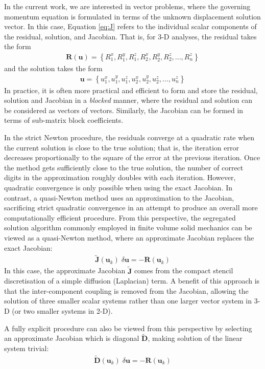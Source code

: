 \documentclass[sn-mathphys,Numbered]{sn-jnl}%
\newcommand{\bb}{\boldsymbol}
\begin{document}
In the current work, we are interested in vector problems, where the governing momentum equation is formulated in terms of the unknown displacement solution vector.
In this case, Equation \ref{eq:J} refers to the individual scalar components of the residual, solution, and Jacobian.
That is, for 3-D analyses, the residual takes the form
\begin{eqnarray}
	\bb{R}(\bb{u}) = \left\{ R_1^x, R_1^y, R_1^z, R_2^x, R_2^y, R_2^z, ..., R_n^z \right\}
\end{eqnarray}
and the solution takes the form
\begin{eqnarray}
	\bb{u} = \left\{ u_1^x, u_1^y, u_1^z, u_2^x, u_2^y, u_2^z, ..., u_n^z \right\}
\end{eqnarray}
In practice, it is often more practical and efficient to form and store the residual, solution and Jacobian in a \emph{blocked} manner, where the residual and solution can be considered as vectors of vectors.
Similarly, the Jacobian can be formed in terms of sub-matrix block coefficients.

In the strict Newton procedure, the residuals converge at a quadratic rate when the current solution is close to the true solution; that is, the iteration error decreases proportionally to the square of the error at the previous iteration.
Once the method gets sufficiently close to the true solution, the number of correct digits in the approximation roughly doubles with each iteration. 
However, quadratic convergence is only possible when using the exact Jacobian.
In contrast, a quasi-Newton method uses an approximation to the Jacobian, sacrificing strict quadratic convergence in an attempt to produce an overall more computationally efficient procedure.
From this perspective, the segregated solution algorithm commonly employed in finite volume solid mechanics can be viewed as a quasi-Newton method, where an approximate Jacobian replaces the exact Jacobian: 
\begin{eqnarray} \label{eq:Seg}
    \bb{\tilde{J}}(\bb{u}_k) \;\delta \bb{u} = -\bb{R}(\bb{u}_k)
\end{eqnarray}
In this case, the approximate Jacobian $\bb{\tilde{J}}$ comes from the compact stencil discretisation of a simple diffusion (Laplacian) term.
A benefit of this approach is that the inter-component coupling is removed from the Jacobian, allowing the solution of three smaller scalar systems rather than one larger vector system in 3-D (or two smaller systems in 2-D).

A fully explicit procedure can also be viewed from this perspective by selecting an approximate Jacobian which is diagonal $\bb{\tilde{D}}$, making solution of the linear system trivial:
\begin{eqnarray} \label{eq:exp}
    \bb{\tilde{D}}(\bb{u}_k) \;\delta \bb{u} = -\bb{R}(\bb{u}_k)
\end{eqnarray}
\end{document}
